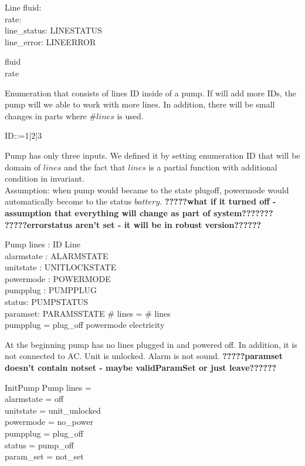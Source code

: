 \documentclass{article}
\begin{document}
	\begin{schema}{Line}
		fluid: \nat \\
		rate: \nat \\
		line\_status: LINESTATUS \\
		line\_error: LINEERROR
	\where

	
		fluid  \\ 
		rate 
	\end{schema}
	
	Enumeration that consists of lines ID inside of a pump. If will add more IDs, the pump will we able to work with more lines. In addition, there will be small changes in parts where $\# lines$ is used.
	\begin{zed}
		ID::=1|2|3
	\end{zed}
	
	Pump has only three inputs. We defined it by setting enumeration ID that will be domain of $lines$ and the fact that $lines$ is a partial function with additional condition in invariant.\\
		Assumption: when pump would became to the state plugoff, powermode would automatically become to the status $battery$. \textbf{?????what if it turned off - assumption that everything will change as part of system???????}\\
	
	\textbf{?????errorstatus aren't set - it will be in robust version??????}
	\begin{schema}{Pump}
		lines : ID \pfun Line \\
		alarmstate : ALARMSTATE \\
		unitstate : UNITLOCKSTATE \\
		powermode : POWERMODE \\
		pumpplug : PUMPPLUG \\
		status: PUMPSTATUS \\
		paramset: PARAMSSTATE
	\where
		\# \ran lines = \# \dom lines \\
		pumpplug = plug\_off \implies powermode \neq electricity 
	\end{schema}
	
	
	At the beginning pump has no lines plugged in and powered off. In addition, it is not connected to AC. Unit is unlocked. Alarm is not sound. 
	\textbf{?????paramset doesn't contain notset - maybe validParamSet or just leave??????}
		
	
	\begin{schema}{InitPump}
		Pump
		\where
		lines = \emptyset \\
		alarmstate = off \\
		unitstate  = unit\_unlocked \\
		powermode =  no\_power \\
		pumpplug = plug\_off \\
		status = pump\_off\\
		param\_set = not\_set	
	\end{schema}
	
\end{document}
